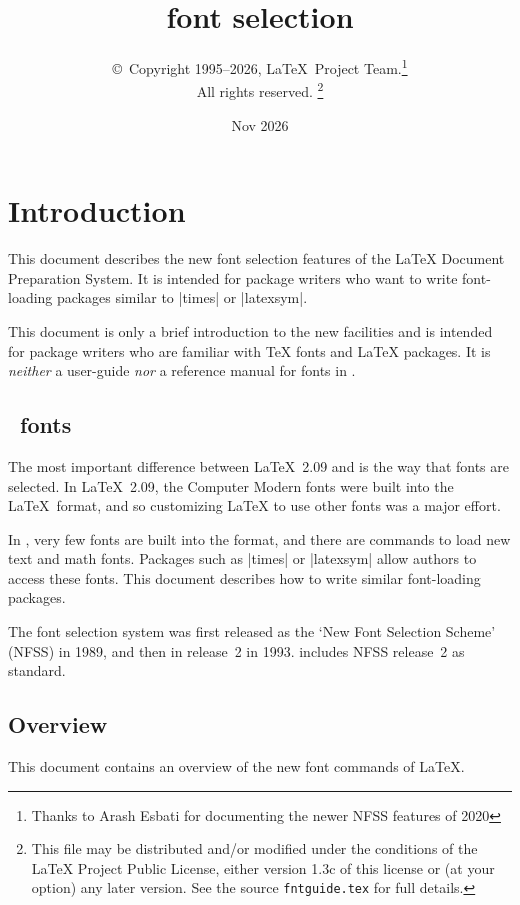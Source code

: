 \documentclass{ltxguide}[1995/11/28]
\title{\LaTeXe{} font selection}
\author{\copyright~Copyright 1995--2026, \LaTeX\ Project
  Team.\thanks{Thanks to Arash Esbati for documenting the
    newer NFSS features of 2020}\\
  All rights reserved.%
  \footnote{This file may be distributed and/or modified under the
    conditions of the \LaTeX{} Project Public License, either version 1.3c
    of this license or (at your option) any later version. See the source
   \texttt{fntguide.tex} for full details.}%
}
\date{Nov 2026}
\begin{document}
\maketitle

\tableofcontents

\section{Introduction}

This  document describes the new font selection features of the \LaTeX{}
Document Preparation System.  It is intended for package writers who
want to write font-loading packages similar to |times| or |latexsym|.

This document is only a brief introduction to the new facilities and is
intended for package writers who are familiar with \TeX{} fonts and
\LaTeX{} packages.  It is \emph{neither} a user-guide \emph{nor} a
reference manual for fonts in \LaTeXe.

\subsection{\LaTeXe~fonts}

The most important difference between \LaTeX~2.09 and \LaTeXe{} is the
way that fonts are selected.  In \LaTeX~2.09, the Computer Modern fonts
were built into the \LaTeX~format, and so customizing \LaTeX{} to use
other fonts was a major effort.

In \LaTeXe, very few fonts are built into the format, and there are
commands to load new text and math fonts.  Packages such as |times| or
|latexsym| allow authors to access these fonts.  This document describes
how to write similar font-loading packages.

The \LaTeXe{} font selection system was first released as the `New Font
Selection Scheme' (NFSS) in 1989, and then in release~2 in 1993.
\LaTeXe{} includes NFSS release~2 as standard.

\subsection{Overview}

This document contains an overview of the new font commands of \LaTeX.
\end{document}
